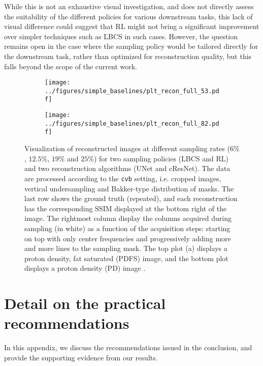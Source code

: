 While this is not an exhaustive visual investigation, and does not directly assess the suitability of the different policies for various downstream tasks, this lack of visual difference could suggest that RL might not bring a significant improvement over simpler techniques such as LBCS in such cases. However, the question remains open in the case where the sampling policy would be tailored directly for the downstream task, rather than optimized for reconstruction quality, but this falls beyond the scope of the current work. 

\begin{figure}[!ht]
\begin{subfigure}[b]{0.6\textwidth}
    \centering
    \texttt{[image: ../figures/simple\_baselines/plt\_recon\_full\_53.pdf]}
    \caption{}\label{fig:recon_plot_a}
    \end{subfigure}
    \hfill
    \begin{subfigure}[b]{0.6\textwidth}
    \centering
    \texttt{[image: ../figures/simple\_baselines/plt\_recon\_full\_82.pdf]}
    \caption{}\label{fig:recon_plot_b}
    \end{subfigure}
    \centering
    \caption{Visualization of reconstructed images at different sampling rates ($6\%$, $12.5\%$, $19\%$ and $25\%$) for two sampling policies (LBCS and RL) and two reconstruction algorithms (UNet and cResNet). The data are processed according to the \texttt{cvb} setting, i.e. cropped images, vertical undersampling and Bakker-type distribution of masks. The last row shows the ground truth (repeated), and each reconstruction has the corresponding SSIM displayed at the bottom right of the image. The rightmost column display the columns acquired during sampling (in white) as a function of the acquisition steps: starting on top with only center frequencies and progressively adding more and more lines to the sampling mask. The top plot (a) displays a proton density, fat saturated (PDFS) image, and the bottom plot displays a proton density (PD) image \citep{zbontarFastMRIOpenDataset2019}.}
    \label{fig:recon_plot}
    \vspace{-.4cm}
\end{figure}

\clearpage
\FloatBarrier
\section{Detail on the practical recommendations}\label{app:conclusions}
In this appendix, we discuss the recommendations issued in the conclusion, and provide the supporting evidence from our results.

